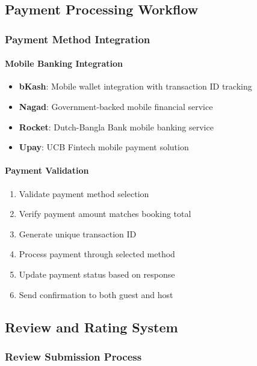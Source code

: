 \documentclass[12pt,a4paper]{article}
\begin{document}
\subsection{Payment Processing Workflow}
\label{subsec:payment-workflow}

\subsubsection{Payment Method Integration}
\label{subsubsec:payment-integration}

\paragraph{Mobile Banking Integration}
\begin{itemize}
\item \textbf{bKash}: Mobile wallet integration with transaction ID tracking
\item \textbf{Nagad}: Government-backed mobile financial service
\item \textbf{Rocket}: Dutch-Bangla Bank mobile banking service
\item \textbf{Upay}: UCB Fintech mobile payment solution
\end{itemize}

\paragraph{Payment Validation}
\begin{enumerate}
\item Validate payment method selection
\item Verify payment amount matches booking total
\item Generate unique transaction ID
\item Process payment through selected method
\item Update payment status based on response
\item Send confirmation to both guest and host
\end{enumerate}

\subsection{Review and Rating System}
\label{subsec:review-system}

\subsubsection{Review Submission Process}
\label{subsubsec:review-submission}
\end{document}
